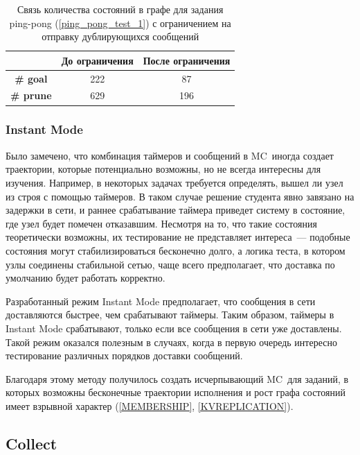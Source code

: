 \documentclass[a4paper,12pt]{extarticle}
\newcommand{\mc}[0]{MC}
\begin{document}
\begin{table}[htbp]
    \begin{center}
        \caption{Связь количества состояний в графе для задания ping-pong (\cref{ping_pong_test_1}) с ограничением на отправку дублирующихся сообщений}
        \begin{tabular}{|c|c|c|}
    \hline
     & \textbf{До ограничения} & \textbf{После ограничения}  \\
    \hline
    \textbf{\# goal} & 222 & 87 \\
    \hline
    \textbf{\# prune} & 629 & 196 \\
    \hline
    \end{tabular}
    \label{tab3}
    \end{center}
\end{table}

\subsubsection{Instant Mode}

Было замечено, что комбинация таймеров и сообщений в \mc\ иногда создает траектории, которые потенциально возможны, но не всегда интересны для изучения.
Например, в некоторых задачах требуется определять, вышел ли узел из строя с помощью таймеров.
В таком случае решение студента явно завязано на задержки в сети, и раннее срабатывание таймера приведет систему в состояние, где узел будет помечен отказавшим.
Несмотря на то, что такие состояния теоретически возможны, их тестирование не представляет интереса~--- подобные состояния могут стабилизироваться бесконечно долго, а логика теста, в котором узлы соединены стабильной сетью, чаще всего предполагает, что доставка по умолчанию будет работать корректно.

Разработанный режим Instant Mode предполагает, что сообщения в сети доставляются быстрее, чем срабатывают таймеры.
Таким образом, таймеры в Instant Mode срабатывают, только если все сообщения в сети уже доставлены.
Такой режим оказался полезным в случаях, когда в первую очередь интересно тестирование различных порядков доставки сообщений.

Благодаря этому методу получилось создать исчерпывающий \mc\ для заданий, в которых возможны бесконечные траектории исполнения и рост графа состояний имеет взрывной характер (\cref{MEMBERSHIP}, \cref{KVREPLICATION}).


\subsection{Collect}
\label{collect}
\end{document}
